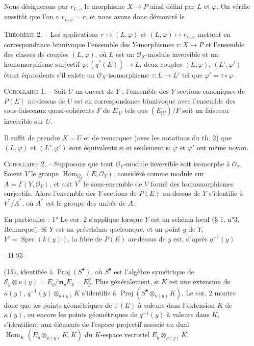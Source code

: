Nous désignerons par $r_{L, \varphi}$ le morphisme $X \to P$ ainsi défini par $L$ et $\varphi$.
On vérifie aussitôt que l'on a $r_{L, \varphi} = r$, et nous avons donc démontré le

\textsc{Théorème 2.} -- Les applications $r \mapsto (L, \varphi)$ et $(L, \varphi) \mapsto r_{L, \varphi}$ mettent en correspondance biunivoque l'ensemble des $Y$-morphismes $r : X \to P$ et l'ensemble des classes de couples $(L, \varphi)$, où $L$ est un $\mathcal{O}_X$-module inversible et un homomorphisme surjectif $\varphi : (q^*(E)) \to L$, deux couples $(L, \varphi)$, $(L', \varphi')$ étant équivalents s'il existe un $\mathcal{O}_X$-isomorphisme $\tau : L \to L'$ tel que $\varphi' = \tau \circ \varphi$.

\textsc{Corollaire 1.} -- Soit $U$ un ouvert de $Y$ ; l'ensemble des $Y$-sections canoniques de $P(E)$ au-dessus de $U$ est en correspondance biunivoque avec l'ensemble des sous-faisceaux quasi-cohérents $F$ de $E_{|U}$ tels que $(E_{|U})/F$ soit un faisceau inversible sur $U$.

Il suffit de prendre $X = U$ et de remarquer (avec les notations du th. 2) que $(L, \varphi)$ et $(L', \varphi')$ sont équivalents si et seulement si $\varphi$ et $\varphi'$ ont même noyau.

\textsc{Corollaire 2.} -- Supposons que tout $\mathcal{O}_Y$-module inversible soit isomorphe à $\mathcal{O}_Y$. Soient $V$ le groupe $\operatorname{Hom}_{\mathcal{O}_Y}(E, \mathcal{O}_Y)$, considéré comme module sur $A = \Gamma(Y, \mathcal{O}_Y)$, et soit $V^*$ le sous-ensemble de $V$ formé des homomorphismes surjectifs. Alors l'ensemble des $Y$-sections de $P(E)$ au-dessus de $Y$ s'identifie à $V^* / A^*$, où $A^*$ est le groupe des unités de $A$.

En particulier :
1° Le cor. 2 s'applique lorsque $Y$ est un schéma local (§ 1, n°3, Remarque). Si $Y$ est un préschéma quelconque, et un point $y$ de $Y$, $Y' = \operatorname{Spec}(k(y))$, la fibre de $P(E)$ au-dessus de $y$ est, d'après $q^{-1}(y)$

\newpage


- II-93 -

(15), identifiée à $\operatorname{Proj}(S^\bullet)$, où $S^\bullet$ est l'algèbre symétrique de $\mathcal{E}_y \otimes \kappa(y) = E_y / \mathfrak{m}_y E_y = E_y^y$. Plus généralement, si $K$ est une extension de $\kappa(y)$, $q^{-1}(y) \otimes_{\kappa(y)} K$ s'identifie à $\operatorname{Proj}(S^\bullet \otimes_{\kappa(y)} K)$. Le cor. 2 montre donc que les points géométriques de $\mathbb{P}(E)$ à valeurs dans l'extension $K$ de $\kappa(y)$, ou encore les points géométriques de $q^{-1}(y)$ à valeurs dans $K$, s'identifient aux éléments de l'espace projectif associé au dual $\operatorname{Hom}_K(E_y \otimes_{\kappa(y)} K, K)$ du $K$-espace vectoriel $E_y \otimes_{\kappa(y)} K$.

